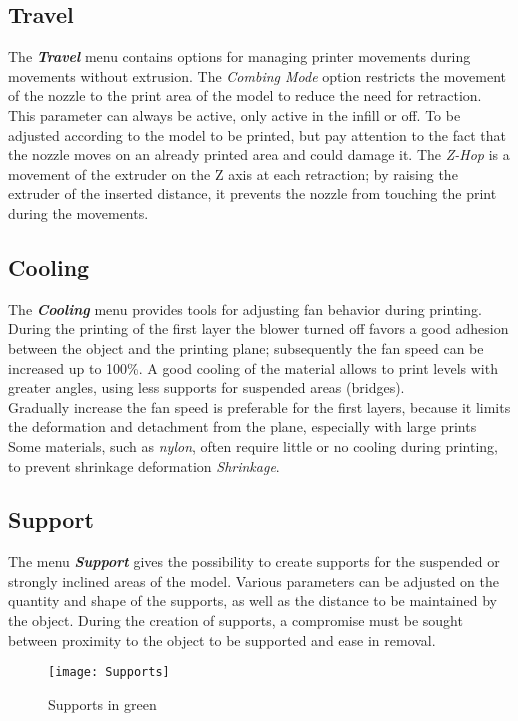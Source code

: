 \subsection{Travel}
The \emph{\textbf{Travel}} menu contains options for managing printer movements during movements without extrusion. The \emph{Combing Mode} option restricts the movement of the nozzle to the print area of the model to reduce the need for retraction. This parameter can always be active, only active in the infill or off. To be adjusted according to the model to be printed, but pay attention to the fact that the nozzle moves on an already printed area and could damage it.
The \emph{Z-Hop} is a movement of the extruder on the Z axis at each retraction; by raising the extruder of the inserted distance, it prevents the nozzle from touching the print during the movements.

\subsection{Cooling}
The \emph{\textbf{Cooling}} menu provides tools for adjusting fan behavior during printing. During the printing of the first layer the blower turned off favors a good adhesion between the object and the printing plane; subsequently the fan speed can be increased up to 100\%. A good cooling of the material allows to print levels with greater angles, using less supports for suspended areas (bridges). \\ Gradually increase the fan speed is preferable for the first layers, because it limits the deformation and detachment from the plane, especially with large prints Some materials, such as \emph{nylon}, often require little or no cooling during printing, to prevent shrinkage deformation \emph{Shrinkage}.

\subsection{Support}
The menu \emph{\textbf{Support}} gives the possibility to create supports for the suspended or strongly inclined areas of the model. Various parameters can be adjusted on the quantity and shape of the supports, as well as the distance to be maintained by the object. During the creation of supports, a compromise must be sought between proximity to the object to be supported and ease in removal.
\begin{figure}[h]
	\centering
	\texttt{[image: Supports]}
    \caption{Supports in green}
    \label{fig:Supports}
\end{figure}

